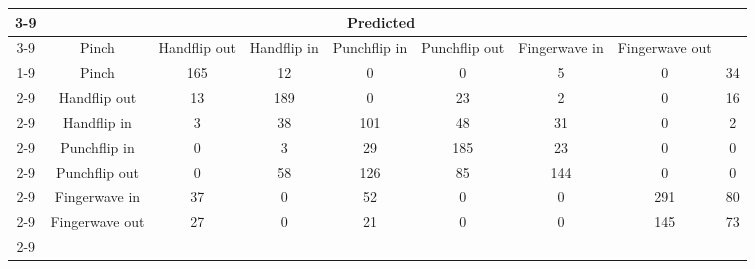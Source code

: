 \documentclass{standalone}
\begin{document}
 
 \begin{tabular}{|c |c |c |c |c |c |c |c |c |}
\cline{3-9}\multicolumn{2}{c|}{} & \multicolumn{7}{c|}{Predicted} \\ 
\cline{3-9} \multicolumn{2}{c |}{ } & Pinch & Handflip out & Handflip in & Punchflip in & Punchflip out & Fingerwave in & Fingerwave out\\ 
\cline{1-9}\multirow{7}{*}{\rotatebox[origin=c]{90}{Actual}} & Pinch & 165 & 12 & 0 & 0 & 5 & 0 & 34\\ 
 \cline{2-9} & Handflip out & 13 & 189 & 0 & 23 & 2 & 0 & 16\\ 
 \cline{2-9} & Handflip in & 3 & 38 & 101 & 48 & 31 & 0 & 2\\ 
 \cline{2-9} & Punchflip in & 0 & 3 & 29 & 185 & 23 & 0 & 0\\ 
 \cline{2-9} & Punchflip out & 0 & 58 & 126 & 85 & 144 & 0 & 0\\ 
 \cline{2-9} & Fingerwave in & 37 & 0 & 52 & 0 & 0 & 291 & 80\\ 
 \cline{2-9} & Fingerwave out & 27 & 0 & 21 & 0 & 0 & 145 & 73\\ 
 \cline{2-9}\hline \end{tabular}
 
\end{document}
